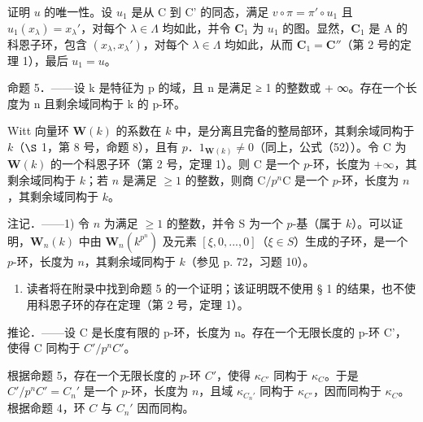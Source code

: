 证明 \(u\) 的唯一性。设 \(u_{1}\) 是从 C 到 C' 的同态，满足 \(v \circ \pi = \pi' \circ u_{1}\) 且 \(u_{1}(x_{\lambda}) = x_{\lambda}'\)，对每个 \(\lambda \in \Lambda\) 均如此，并令 \(\mathbf{C}_{1}\) 为 \(u_{1}\) 的图。显然，\(\mathbf{C}_{1}\) 是 A 的科恩子环，包含 \((x_{\lambda}, x_{\lambda}')\)，对每个 \(\lambda \in \Lambda\) 均如此，从而 \(\mathbf{C}_{1} = \mathbf{C}''\)（第 2 号的定理 1），最后 \(u_{1} = u\)。

命题 5．——设 k 是特征为 p 的域，且 n 是满足 ≥ 1 的整数或 + ∞。存在一个长度为 n 且剩余域同构于 k 的 p-环。

Witt 向量环 \(\mathbf{W}(k)\) 的系数在 \(k\) 中，是分离且完备的整局部环，其剩余域同构于 \(k\)（\(\S\) 1，第 8 号，命题 8），且有 \(p\)．\(1_{\mathbf{W}(k)} \neq 0\)（同上，公式（52））。令 C 为 \(\mathbf{W}(k)\) 的一个科恩子环（第 2 号，定理 1）。则 C 是一个 \(p\)-环，长度为 +\(\infty\)，其剩余域同构于 \(k\)；若 \(n\) 是满足 \(\geqslant 1\) 的整数，则商 \(\mathrm{C}/p^{n}\mathrm{C}\) 是一个 \(p\)-环，长度为 \(n\)，其剩余域同构于 \(k\)。

注记．——1) 令 \(n\) 为满足 \(\geqslant 1\) 的整数，并令 S 为一个 \(p\)-基（属于 \(k\)）。可以证明，\(\mathbf{W}_{n}(k)\) 中由 \(\mathbf{W}_{n}(k^{p^{n}})\) 及元素 \([\xi, 0, ..., 0]\)（\(\xi \in S\)）生成的子环，是一个 \(p\)-环，长度为 \(n\)，其剩余域同构于 \(k\)（参见 p. 72，习题 10）。

\begin{enumerate}
\def\labelenumi{\arabic{enumi})}
\setcounter{enumi}{1}
\tightlist
\item
  读者将在附录中找到命题 5 的一个证明；该证明既不使用 § 1 的结果，也不使用科恩子环的存在定理（第 2 号，定理 1）。
\end{enumerate}

推论．——设 C 是长度有限的 p-环，长度为 n。存在一个无限长度的 p-环 C'，使得 C 同构于 \(C'/p^{n}C'\)。

根据命题 5，存在一个无限长度的 \(p\)-环 \(C'\)，使得 \(\kappa_{C'}\) 同构于 \(\kappa_{C}\)。于是 \(C'/p^{n}C'=C_{n}'\) 是一个 \(p\)-环，长度为 \(n\)，且域 \(\kappa_{C_{n}'}\) 同构于 \(\kappa_{C'}\)，因而同构于 \(\kappa_{C}\)。根据命题 4，环 \(C\) 与 \(C_{n}'\) 因而同构。

